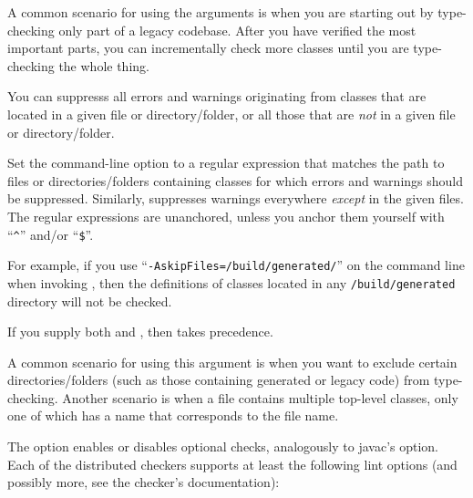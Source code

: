 A common scenario for using the arguments is when you are starting out by
type-checking only part of a legacy codebase.  After you have verified the
most important parts, you can incrementally check more classes until you
are type-checking the whole thing.



You can suppresss all errors and warnings originating from classes that are
located in a given file or directory/folder, or all those that are \emph{not} in a
given file or directory/folder.

Set the  command-line option to a
regular expression that matches the path to files or directories/folders containing
classes for which errors and warnings should be suppressed.
Similarly,  suppresses warnings everywhere
\emph{except} in the given files.
The regular expressions are unanchored, unless you anchor them yourself
with ``\codesize\verb|^|'' and/or ``\codesize\verb|$|''.

For example, if you use
``{\codesize\verb|-AskipFiles=/build/generated/|}'' on the command line
when invoking
, then the definitions of classes located in any
\codesize\verb|/build/generated| directory will not be checked.

If you supply both  and , then
 takes precedence.

A common scenario for using this argument is when you want to exclude certain
directories/folders (such as those containing generated or legacy code) from
type-checking.
Another scenario is when a file contains multiple top-level classes, only
one of which has a name that corresponds to the file name.



The  option enables or disables optional checks, analogously to
javac's  option.
Each of the distributed checkers supports at least the following lint
options (and possibly more, see the checker's documentation):




